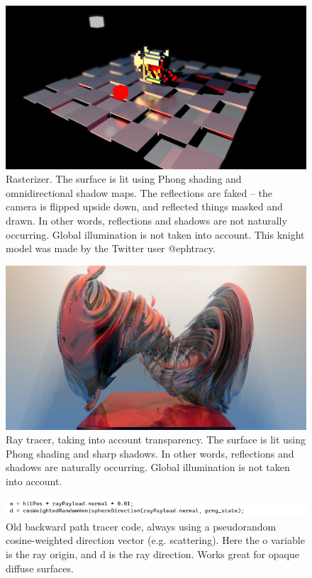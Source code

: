 \documentclass[12pt]{article}
\begin{document}
\begin{figure} 
\centering
  \includegraphics[width = 6 in]{fig1.png}
  \caption{ Rasterizer.
The surface is lit using Phong shading and omnidirectional shadow maps.
The reflections are faked -- the camera is flipped upside down, and reflected things masked and drawn.
In other words, reflections and shadows are not naturally occurring.
Global illumination is not taken into account.
This knight model was made by the Twitter user @ephtracy.
}

\end{figure}






\begin{figure} 
\centering
  \includegraphics[width = 6 in]{fig2.png}
  \caption{ Ray tracer, taking into account transparency.
The surface is lit using Phong shading and sharp shadows.
In other words, reflections and shadows are naturally occurring.
Global illumination is not taken into account.
}
\end{figure}




\begin{figure} 
\centering
  \includegraphics[width = 6 in]{fig3.png}
  \caption{ Old backward path tracer code, always using a pseudorandom cosine-weighted direction vector (e.g. scattering).
Here the o variable is the ray origin, and d is the ray direction.
Works great for opaque diffuse surfaces.
}
\end{figure}
\end{document}
